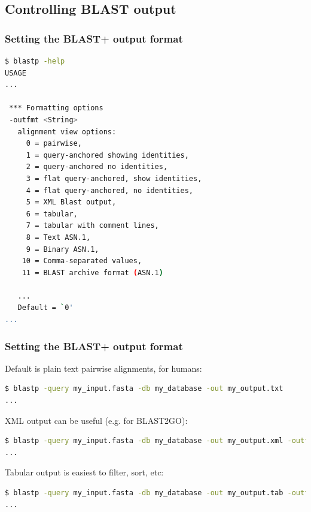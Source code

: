 \documentclass[table]{beamer}
\begin{document}
\subsection{Controlling BLAST output}

\begin{frame}[fragile]
\frametitle{Setting the BLAST+ output format}
%
%
\begin{lstlisting}[language=sh]
$ blastp -help
USAGE
...

 *** Formatting options
 -outfmt <String>
   alignment view options:
     0 = pairwise,
     1 = query-anchored showing identities,
     2 = query-anchored no identities,
     3 = flat query-anchored, show identities,
     4 = flat query-anchored, no identities,
     5 = XML Blast output,
     6 = tabular,
     7 = tabular with comment lines,
     8 = Text ASN.1,
     9 = Binary ASN.1,
    10 = Comma-separated values,
    11 = BLAST archive format (ASN.1)

   ...
   Default = `0'
...
\end{lstlisting}
\end{frame}


\begin{frame}[fragile]
\frametitle{Setting the BLAST+ output format}

Default is plain text pairwise alignments, for humans:

\begin{lstlisting}[language=sh]
$ blastp -query my_input.fasta -db my_database -out my_output.txt
...
\end{lstlisting}

XML output can be useful (e.g. for BLAST2GO):

\begin{lstlisting}[language=sh]
$ blastp -query my_input.fasta -db my_database -out my_output.xml -outfmt 5
...
\end{lstlisting}

Tabular output is easiest to filter, sort, etc:

\begin{lstlisting}[language=sh]
$ blastp -query my_input.fasta -db my_database -out my_output.tab -outfmt 6
...
\end{lstlisting}
\end{frame}
\end{document}
